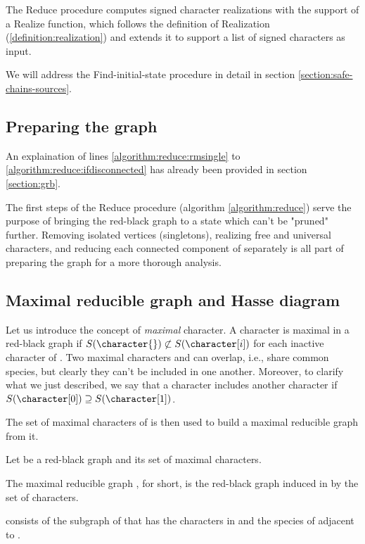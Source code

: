 The Reduce procedure computes signed character realizations with the support of a Realize function, which follows the definition of Realization (\ref{definition:realization}) and extends it to support a list of signed characters as input.

We will address the Find-initial-state procedure in detail in section \ref{section:safe-chains-sources}.

\subsection{Preparing the graph}\label{section:preparing-the-graph}

An explaination of lines \ref{algorithm:reduce:rmsingle} to \ref{algorithm:reduce:ifdisconnected} has already been provided in section \ref{section:grb}.

The first steps of the Reduce procedure (algorithm \ref{algorithm:reduce}) serve the purpose of bringing the red-black graph to a state which can't be "pruned" further.
Removing isolated vertices (singletons), realizing free and universal characters, and reducing each connected component of \grb{} separately is all part of preparing the graph for a more thorough analysis.

\subsection{Maximal reducible graph and Hasse diagram}\label{section:gm-hassediagram}

Let us introduce the concept of \emph{maximal} character. A character \character{} is maximal in a red-black graph \grb{} if $S(\character{}) \not\subset S(\character[i])$ for each inactive character \character[i] of \grb{}. Two maximal characters \character[0] and \character[1] can overlap, i.e., share common species, but clearly they can't be included in one another. Moreover, to clarify what we just described, we say that a character \character[0] includes another character \character[1] if $S(\character[0]) \supseteq S(\character[1])$.

The set of maximal characters of \grb{} is then used to build a maximal reducible graph \grbcm{} from it.

\begin{definition}\label{definition:maximal-reducible-graph}
  Let \grb{} be a red-black graph and \cm{} its set of maximal characters.

  The maximal reducible graph \grbcm{}, \gm{} for short, is the red-black graph induced in \grb{} by the set \cm{} of characters.

  \gm{} consists of the subgraph of \grb{} that has the characters in \cm{} and the species of \grb{} adjacent to \cm{}.
\end{definition}

